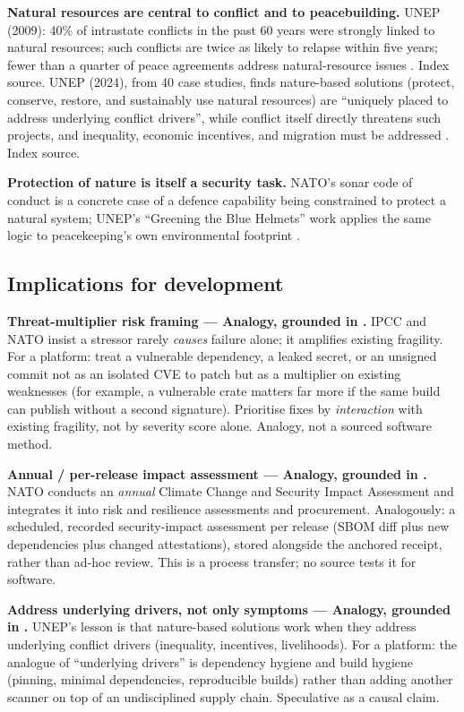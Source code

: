 \documentclass[11pt]{article}
\begin{document}
\textbf{Natural resources are central to conflict and to
peacebuilding.} UNEP (2009): 40\% of intrastate conflicts in the past
60 years were strongly linked to natural resources; such conflicts are
twice as likely to relapse within five years; fewer than a quarter of
peace agreements address natural-resource issues \cite{unep2009}. Index
source. UNEP (2024), from 40 case studies, finds nature-based solutions
(protect, conserve, restore, and sustainably use natural resources) are
``uniquely placed to address underlying conflict drivers'', while
conflict itself directly threatens such projects, and inequality,
economic incentives, and migration must be addressed \cite{unep2024}.
Index source.

\textbf{Protection of nature is itself a security task.} NATO's sonar
code of conduct is a concrete case of a defence capability being
constrained to protect a natural system; UNEP's ``Greening the Blue
Helmets'' work applies the same logic to peacekeeping's own
environmental footprint \cite{nato-topic,unep2009}.

\subsection{Implications for development}

\textbf{Threat-multiplier risk framing --- Analogy, grounded in
\cite{ipcc2022,nato2021}.} IPCC and NATO insist a stressor rarely
\emph{causes} failure alone; it amplifies existing fragility. For a
platform: treat a vulnerable dependency, a leaked secret, or an unsigned
commit not as an isolated CVE to patch but as a multiplier on existing
weaknesses (for example, a vulnerable crate matters far more if the same
build can publish without a second signature). Prioritise fixes by
\emph{interaction} with existing fragility, not by severity score alone.
Analogy, not a sourced software method.

\textbf{Annual / per-release impact assessment --- Analogy, grounded in
\cite{nato2021}.} NATO conducts an \emph{annual} Climate Change and
Security Impact Assessment and integrates it into risk and resilience
assessments and procurement. Analogously: a scheduled, recorded
security-impact assessment per release (SBOM diff plus new dependencies
plus changed attestations), stored alongside the anchored receipt, rather
than ad-hoc review. This is a process transfer; no source tests it for
software.

\textbf{Address underlying drivers, not only symptoms --- Analogy,
grounded in \cite{unep2024}.} UNEP's lesson is that nature-based
solutions work when they address underlying conflict drivers
(inequality, incentives, livelihoods). For a platform: the analogue of
``underlying drivers'' is dependency hygiene and build hygiene (pinning,
minimal dependencies, reproducible builds) rather than adding another
scanner on top of an undisciplined supply chain. Speculative as a causal
claim.
\end{document}
